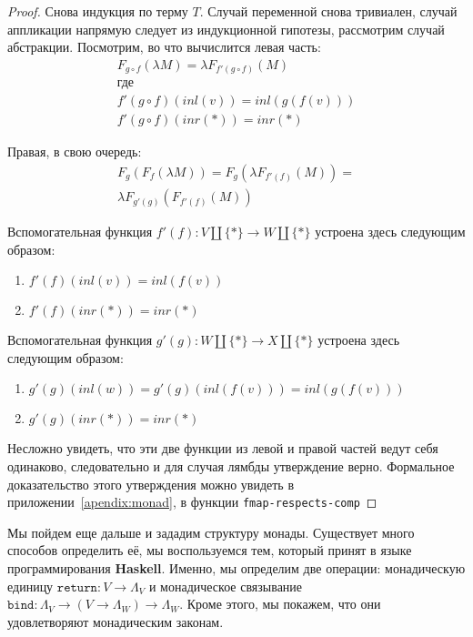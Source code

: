 \begin{proof}
  Снова индукция по терму $T$. Случай переменной снова тривиален, случай аппликации напрямую следует из индукционной гипотезы, рассмотрим случай абстракции. Посмотрим, во что вычислится левая часть:
  \begin{gather*}
    F_{g \circ f}(\lambda M) = \lambda F_{f'(g \circ f)}(M) \\
    \text{где} \\
    f'(g \circ f)(inl(v)) = inl(g(f(v))) \\
    f'(g \circ f)(inr(*)) = inr(*)
  \end{gather*}

  Правая, в свою очередь:
  \begin{gather*}
    F_{g}(F_{f}(\lambda M)) = F_{g}(\lambda F_{f'(f)}(M)) = \\
    \lambda F_{g'(g)}(F_{f'(f)}(M))
  \end{gather*}

  Вспомогательная функция $f'(f) : V \coprod \{*\} \to W \coprod \{*\}$ устроена здесь следующим образом:
  \begin{enumerate}
    \item $f'(f)(inl(v)) = inl(f(v))$
    \item $f'(f)(inr(*)) = inr(*)$
  \end{enumerate}

  Вспомогательная функция $g'(g) : W \coprod \{*\} \to X \coprod \{*\}$ устроена здесь следующим образом:
  \begin{enumerate}
    \item $g'(g)(inl(w)) = g'(g)(inl(f(v))) = inl(g(f(v)))$
    \item $g'(g)(inr(*)) = inr(*)$
  \end{enumerate}

  Несложно увидеть, что эти две функции из левой и правой частей ведут себя одинаково, следовательно и для случая лямбды утверждение верно.
  Формальное доказательство этого утверждения можно увидеть в приложении~\ref{apendix:monad}, в функции \texttt{fmap-respects-сomp}
\end{proof}

Мы пойдем еще дальше и зададим структуру монады. Существует много способов определить её, мы воспользуемся тем, который принят в языке программирования \textbf{Haskell}. Именно, мы определим две операции: монадическую единицу $\texttt{return} : V \to \Lambda_{V}$ и монадическое связывание $\texttt{bind} : \Lambda_{V} \to (V \to \Lambda_{W}) \to \Lambda_{W}$. Кроме этого, мы покажем, что они удовлетворяют монадическим законам.

